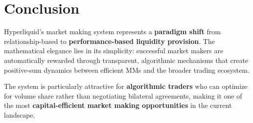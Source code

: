 \documentclass[11pt,a4paper]{article}
\begin{document}
\section{Conclusion}

Hyperliquid's market making system represents a \textbf{paradigm shift} from relationship-based to \textbf{performance-based liquidity provision}. The mathematical elegance lies in its simplicity: successful market makers are automatically rewarded through transparent, algorithmic mechanisms that create positive-sum dynamics between efficient MMs and the broader trading ecosystem.

The system is particularly attractive for \textbf{algorithmic traders} who can optimize for volume share rather than negotiating bilateral agreements, making it one of the most \textbf{capital-efficient market making opportunities} in the current landscape.
\end{document}
